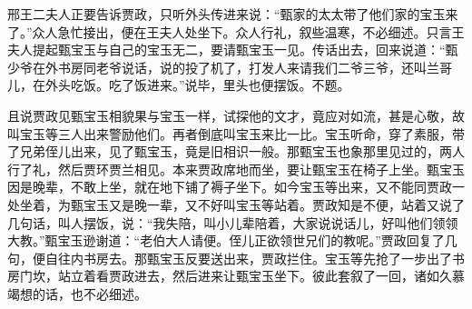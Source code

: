 \begin{parag}
    邢王二夫人正要告诉贾政，只听外头传进来说：“甄家的太太带了他们家的宝玉来了。”众人急忙接出，便在王夫人处坐下。众人行礼，叙些温寒，不必细述。只言王夫人提起甄宝玉与自己的宝玉无二，要请甄宝玉一见。传话出去，回来说道：“甄少爷在外书房同老爷说话，说的投了机了，打发人来请我们二爷三爷，还叫兰哥儿，在外头吃饭。吃了饭进来。”说毕，里头也便摆饭。不题。
\end{parag}


\begin{parag}
    且说贾政见甄宝玉相貌果与宝玉一样，试探他的文才，竟应对如流，甚是心敬，故叫宝玉等三人出来警励他们。再者倒底叫宝玉来比一比。宝玉听命，穿了素服，带了兄弟侄儿出来，见了甄宝玉，竟是旧相识一般。那甄宝玉也象那里见过的，两人行了礼，然后贾环贾兰相见。本来贾政席地而坐，要让甄宝玉在椅子上坐。甄宝玉因是晚辈，不敢上坐，就在地下铺了褥子坐下。如今宝玉等出来，又不能同贾政一处坐着，为甄宝玉又是晚一辈，又不好叫宝玉等站着。贾政知是不便，站着又说了几句话，叫人摆饭，说：“我失陪，叫小儿辈陪着，大家说说话儿，好叫他们领领大教。”甄宝玉逊谢道：“老伯大人请便。侄儿正欲领世兄们的教呢。”贾政回复了几句，便自往内书房去。那甄宝玉反要送出来，贾政拦住。宝玉等先抢了一步出了书房门坎，站立着看贾政进去，然后进来让甄宝玉坐下。彼此套叙了一回，诸如久慕竭想的话，也不必细述。
\end{parag}


